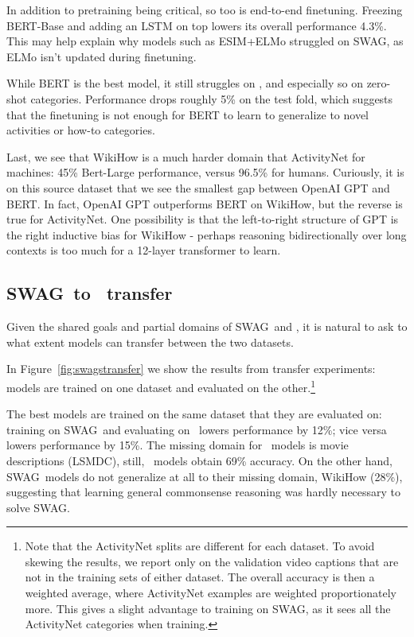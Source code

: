 In addition to pretraining being critical, so too is end-to-end finetuning. Freezing BERT-Base and adding an LSTM on top lowers its overall performance 4.3\%. This may help explain why models such as ESIM+ELMo struggled on {SWAG}, as ELMo isn't updated during finetuning.

While BERT is the best model, it still struggles on {}, and especially so on zero-shot categories. Performance drops roughly 5\% on the test fold, which suggests that the finetuning is not enough for BERT to learn to generalize to novel activities or how-to categories.

Last, we see that WikiHow is a much harder domain that ActivityNet for machines: 45\% Bert-Large performance, versus 96.5\% for humans. Curiously, it is on this source dataset that we see the smallest gap between OpenAI GPT and BERT. In fact, OpenAI GPT outperforms BERT on WikiHow, but the reverse is true for ActivityNet. One possibility is that the left-to-right structure of GPT is the right inductive bias for WikiHow - perhaps reasoning bidirectionally over long contexts is too much for a 12-layer transformer to learn.

\subsection{{SWAG}~to {}~transfer}

Given the shared goals and partial domains of {SWAG}~and {}, it is natural to ask to what extent models can transfer between the two datasets.

In Figure~\ref{fig:swagstransfer} we show the results from transfer experiments: models are trained on one dataset and evaluated on the other.\footnote{Note that the ActivityNet splits are different for each dataset. To avoid skewing the results, we report only on the validation video captions that are not in the training sets of either dataset. The overall accuracy is then a weighted average, where ActivityNet examples are weighted proportionately more. This gives a slight advantage to training on {SWAG}, as it sees all the ActivityNet categories when training.} 

The best models are trained on the same dataset that they are evaluated on: training on {SWAG}~and evaluating on {}~lowers performance by 12\%; vice versa lowers performance by 15\%. The missing domain for {}~models is movie descriptions (LSMDC), still, {}~models obtain 69\% accuracy. On the other hand, {SWAG}~models do not generalize at all to their missing domain, WikiHow (28\%), suggesting that learning general commonsense reasoning was hardly necessary to solve {SWAG}.

